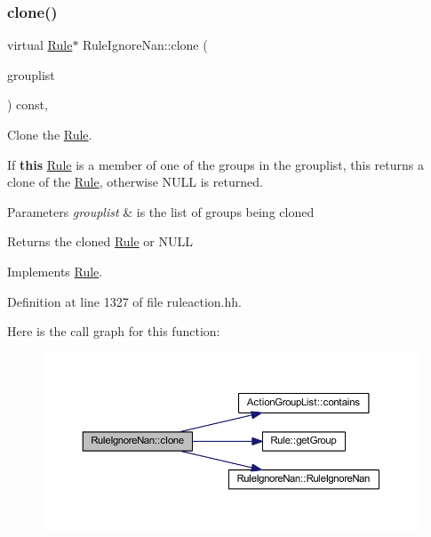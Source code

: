 \subsubsection{\texorpdfstring{clone()}{clone()}}
{\footnotesize\ttfamily virtual \mbox{\hyperlink{class_rule}{Rule}}$\ast$ Rule\+Ignore\+Nan\+::clone (\begin{DoxyParamCaption}\item[{const \mbox{\hyperlink{class_action_group_list}{Action\+Group\+List}} \&}]{grouplist }\end{DoxyParamCaption}) const\hspace{0.3cm}{\ttfamily [inline]}, {\ttfamily [virtual]}}



Clone the \mbox{\hyperlink{class_rule}{Rule}}. 

If {\bfseries{this}} \mbox{\hyperlink{class_rule}{Rule}} is a member of one of the groups in the grouplist, this returns a clone of the \mbox{\hyperlink{class_rule}{Rule}}, otherwise N\+U\+LL is returned. 
\begin{DoxyParams}{Parameters}
{\em grouplist} & is the list of groups being cloned \\
\hline
\end{DoxyParams}
\begin{DoxyReturn}{Returns}
the cloned \mbox{\hyperlink{class_rule}{Rule}} or N\+U\+LL 
\end{DoxyReturn}


Implements \mbox{\hyperlink{class_rule_a70de90a76461bfa7ea0b575ce3c11e4d}{Rule}}.



Definition at line 1327 of file ruleaction.\+hh.

Here is the call graph for this function\+:
\nopagebreak
\begin{figure}[H]
\begin{center}
\leavevmode
\includegraphics[width=350pt]{class_rule_ignore_nan_a6ab45fb568de88034a821f0679a5c91e_cgraph}
\end{center}
\end{figure}
\mbox{\label{class_rule_ignore_nan_a89bc86380b20ccfddd6dadd4e088b086}} 
